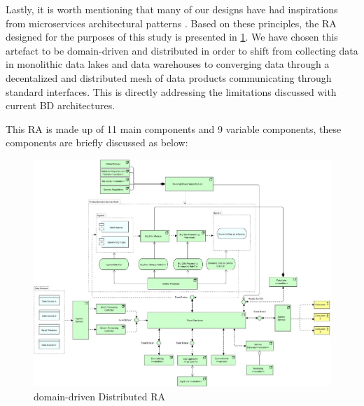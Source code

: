 \documentclass[conference]{IEEEtran}
\begin{document}
Lastly, it is worth mentioning that many of our designs have had inspirations from microservices architectural patterns \cite{richardson2018microservices}. Based on these principles, the RA designed for the purposes of this study is presented in \ref{fig-RA}. We have chosen this artefact to be domain-driven and distributed in order to shift from collecting data in monolithic data lakes and data warehouses to converging data through a decentalized and distributed mesh of data products communicating through standard interfaces. This is directly addressing the limitations discussed with current BD architectures. 

This RA is made up of 11 main components and 9 variable components, these components are briefly discussed as below:

\begin{figure}[h]
    \includegraphics[width=17cm]{media/Metamycelium.jpg}
    \caption{domain-driven Distributed RA}
    \label{fig-RA}
\end{figure}
\end{document}
